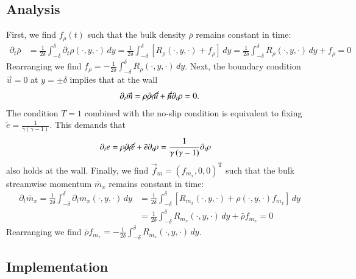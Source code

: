 \documentclass[letterpaper,11pt,nointlimits,reqno]{amsart}
\begin{document}
\subsection*{Analysis}

First, we find $f_{\rho}(t)$ such that the bulk density $\bar{\rho}$
remains constant in time:
\begin{align}
  \partial_{t} \bar{\rho}
  &= \frac{1}{2\delta} \int_{-\delta}^{\delta}
     \partial_{t} \rho\!\left(\cdot,y,\cdot\right) \, dy
   = \frac{1}{2\delta} \int_{-\delta}^{\delta}
     \left[ R_{\rho}\!\left(\cdot,y,\cdot\right) + f_{\rho} \right] \, dy
   = \frac{1}{2\delta} \int_{-\delta}^{\delta}
     R_{\rho}\!\left(\cdot,y,\cdot\right) \, dy + f_{\rho}
   = 0
\end{align}
Rearranging we find $f_{\rho} = - \frac{1}{2\delta} \int_{-\delta}^{\delta}
R_{\rho}\!\left(\cdot,y,\cdot\right) \, dy$.  Next, the boundary condition
$\vec{u} = 0$ at $y = \pm\delta$ implies that at the wall
\begin{align}
  \partial_{t} \vec{m}
  =   \rho \cancel{\partial_{t} \vec{u}}
    + \cancel{\vec{u}} \partial_{t} \rho
  = 0.
\end{align}
The condition $T=1$ combined with the no-slip condition is equivalent to fixing
$\tilde{e}=\frac{1}{\gamma\left(\gamma-1\right)}$.  This demands that
\begin{align}
  \partial_{t} e
  &=  \rho \cancel{\partial_{t} \tilde{e}}
    + \tilde{e} \partial_{t} \rho
  = \frac{1}{\gamma\left(\gamma-1\right)} \partial_{t} \rho
\end{align}
also holds at the wall.  Finally, we find $\vec{f}_{m} =
\left(f_{m_x},0,0\right)^{\textrm{T}}$ such that the bulk streamwise momentum
$\bar{m}_{x}$ remains constant in time:
\begin{align}
  \partial_{t} \bar{m}_x
   = \frac{1}{2\delta} \int_{-\delta}^{\delta}
     \partial_{t} m_{x} \!\left(\cdot,y,\cdot\right) \, dy
  &= \frac{1}{2\delta} \int_{-\delta}^{\delta}
     \left[  R_{m_x}\!\left(\cdot,y,\cdot\right)
           + \rho\!\left(\cdot,y,\cdot\right)  f_{m_x}
     \right] \, dy
  \\
  &= \frac{1}{2\delta} \int_{-\delta}^{\delta}
     R_{m_x}\!\left(\cdot,y,\cdot\right) \, dy + \bar{\rho} f_{m_x}
   = 0
\end{align}
Rearranging we find $\bar{\rho} f_{m_x} = - \frac{1}{2\delta}
\int_{-\delta}^{\delta} R_{m_x}\!\left(\cdot,y,\cdot\right) \, dy$.

\subsection*{Implementation}
\end{document}
